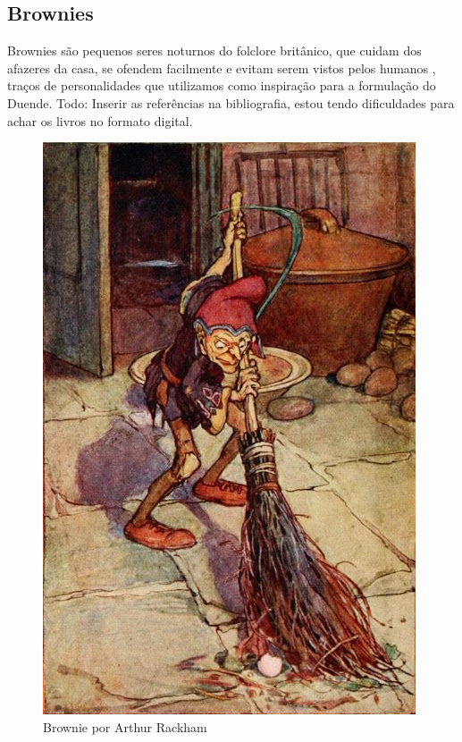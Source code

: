 \subsection{Brownies}
Brownies são pequenos seres noturnos do folclore britânico, que cuidam dos afazeres da casa, se ofendem facilmente e evitam serem vistos pelos humanos \cite{britannica_2011}, traços de personalidades que utilizamos como inspiração para a formulação do Duende.
Todo: Inserir as referências na bibliografia, estou tendo dificuldades para achar os livros no formato digital.
\begin{figure}[htb]
	\caption{\label{fig_grafico}Brownie por Arthur Rackham }
	\begin{center}
	    \includegraphics[scale=0.5]{imagens/brownie.jpg}
	\end{center}
\end{figure}
\vfill
\pagebreak


